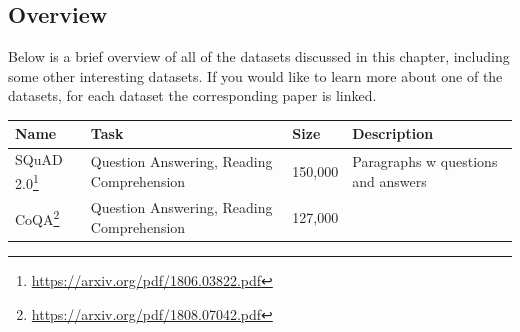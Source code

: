 \documentclass[]{krantz}
\renewcommand{\href}[2]{#2\footnote{\url{#1}}}
\begin{document}
\hypertarget{overview}{%
\subsection{Overview}\label{overview}}

Below is a brief overview of all of the datasets discussed in this chapter, including some other interesting datasets. If you would like to learn more about one of the datasets, for each dataset the corresponding paper is linked.

\begin{longtable}[]{@{}llll@{}}
\toprule
\begin{minipage}[b]{0.31\columnwidth}\raggedright
Name\strut
\end{minipage} & \begin{minipage}[b]{0.24\columnwidth}\raggedright
Task\strut
\end{minipage} & \begin{minipage}[b]{0.10\columnwidth}\raggedright
Size\strut
\end{minipage} & \begin{minipage}[b]{0.23\columnwidth}\raggedright
Description\strut
\end{minipage}\tabularnewline
\midrule
\endhead
\begin{minipage}[t]{0.31\columnwidth}\raggedright
\href{https://arxiv.org/pdf/1806.03822.pdf}{SQuAD 2.0}\strut
\end{minipage} & \begin{minipage}[t]{0.24\columnwidth}\raggedright
Question Answering, Reading Comprehension\strut
\end{minipage} & \begin{minipage}[t]{0.10\columnwidth}\raggedright
150,000\strut
\end{minipage} & \begin{minipage}[t]{0.23\columnwidth}\raggedright
Paragraphs w questions and answers\strut
\end{minipage}\tabularnewline
\begin{minipage}[t]{0.31\columnwidth}\raggedright
\href{https://arxiv.org/pdf/1808.07042.pdf}{CoQA}\strut
\end{minipage} & \begin{minipage}[t]{0.24\columnwidth}\raggedright
Question Answering, Reading Comprehension\strut
\end{minipage} & \begin{minipage}[t]{0.10\columnwidth}\raggedright
127,000\strut
\end{minipage} & \begin{minipage}[t]{0.23\columnwidth}\raggedright

\end{minipage}
\end{longtable}
\end{document}
